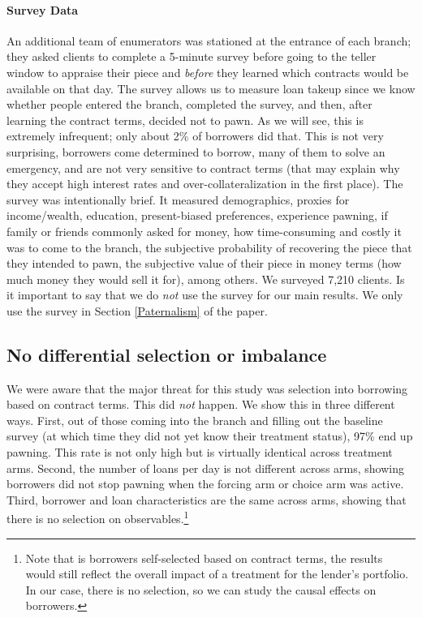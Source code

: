 \documentclass[12pt, a4paper]{article}
\begin{document}
\paragraph*{Survey Data} An additional team of enumerators was stationed at the entrance of each branch; they asked clients to complete a 5-minute survey before going to the teller window to appraise their piece and \textit{before} they learned which contracts would be available on that day. The survey allows us to measure loan takeup since we know whether people entered the branch, completed the survey, and then, after learning the contract terms, decided not to pawn. As we will see, this is extremely infrequent; only about 2\% of borrowers did that. This is not very surprising, borrowers come determined to borrow, many of them to solve an emergency, and are not very sensitive to contract terms (that may explain why they accept high interest rates and over-collateralization in the first place). The survey was intentionally brief. It measured demographics, proxies for income/wealth, education, present-biased preferences, experience pawning, if family or friends commonly asked for money, how time-consuming and costly it was to come to the branch, the subjective probability of recovering the piece that they intended to pawn, the subjective value of their piece in money terms (how much money they would sell it for), among others. We surveyed 7,210 clients. %
Is it important to say that we do \textit{not} use the survey for our main results. We only use the survey in Section \ref{Paternalism} of the paper.


\subsection{No differential selection or imbalance}
\label{sec:integrity}


We were aware that the major threat for this study was selection into borrowing based on contract terms. This did \textit{not} happen. We show this in three different ways. First, out of those coming into the branch and filling out the baseline survey (at which time they did not yet know their treatment status), 97\% end up pawning. This rate is not only high but is virtually identical across treatment arms. Second, the number of loans per day is not different across arms, showing borrowers did not stop pawning when the forcing arm or choice arm was active.  Third, borrower and loan characteristics are the same across arms, showing that there is no selection on observables.\footnote{Note that is borrowers self-selected based on contract terms, the results would still reflect the overall impact of a treatment for the lender's portfolio. In our case, there is no selection, so we can study the causal effects on borrowers.} 
\end{document}
